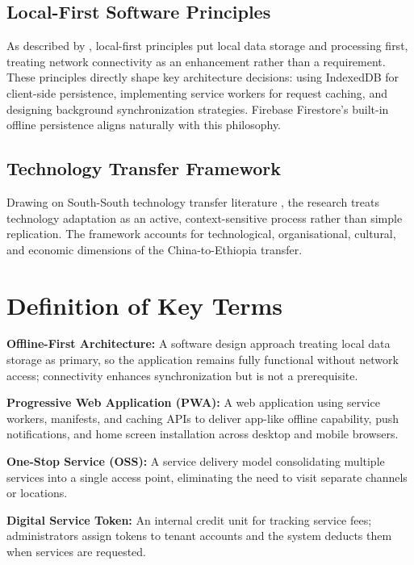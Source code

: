 \subsection{Local-First Software Principles}

As described by \citet{Kleppmann2019}, local-first principles put local data storage and processing first, treating network connectivity as an enhancement rather than a requirement. These principles directly shape key architecture decisions: using IndexedDB for client-side persistence, implementing service workers for request caching, and designing background synchronization strategies. Firebase Firestore's built-in offline persistence aligns naturally with this philosophy.

\subsection{Technology Transfer Framework}

Drawing on South-South technology transfer literature \citep{Chen2018, Hensengerth2018}, the research treats technology adaptation as an active, context-sensitive process rather than simple replication. The framework accounts for technological, organisational, cultural, and economic dimensions of the China-to-Ethiopia transfer.

\section{Definition of Key Terms}

\textbf{Offline-First Architecture:} A software design approach treating local data storage as primary, so the application remains fully functional without network access; connectivity enhances synchronization but is not a prerequisite.

\textbf{Progressive Web Application (PWA):} A web application using service workers, manifests, and caching APIs to deliver app-like offline capability, push notifications, and home screen installation across desktop and mobile browsers.

\textbf{One-Stop Service (OSS):} A service delivery model consolidating multiple services into a single access point, eliminating the need to visit separate channels or locations.

\textbf{Digital Service Token:} An internal credit unit for tracking service fees; administrators assign tokens to tenant accounts and the system deducts them when services are requested.

